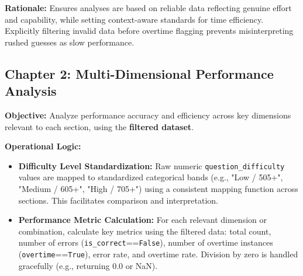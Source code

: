 \documentclass{article}
\begin{document}
\textbf{Rationale:} Ensures analyses are based on reliable data reflecting genuine effort and capability, while setting context-aware standards for time efficiency. Explicitly filtering invalid data before overtime flagging prevents misinterpreting rushed guesses as slow performance.

\subsection{Chapter 2: Multi-Dimensional Performance Analysis}

\textbf{Objective:} Analyze performance accuracy and efficiency across key dimensions relevant to each section, using the \textbf{filtered dataset}.

\textbf{Operational Logic:}
\begin{itemize}
    \item \textbf{Difficulty Level Standardization:} Raw numeric \texttt{question\_difficulty} values are mapped to standardized categorical bands (e.g., "Low / 505+", "Medium / 605+", "High / 705+") using a consistent mapping function across sections. This facilitates comparison and interpretation.
    \item \textbf{Performance Metric Calculation:} For each relevant dimension or combination, calculate key metrics using the filtered data: total count, number of errors (\texttt{is\_correct}==\texttt{False}), number of overtime instances (\texttt{overtime}==\texttt{True}), error rate, and overtime rate. Division by zero is handled gracefully (e.g., returning 0.0 or NaN).
\end{itemize}
\end{document}
